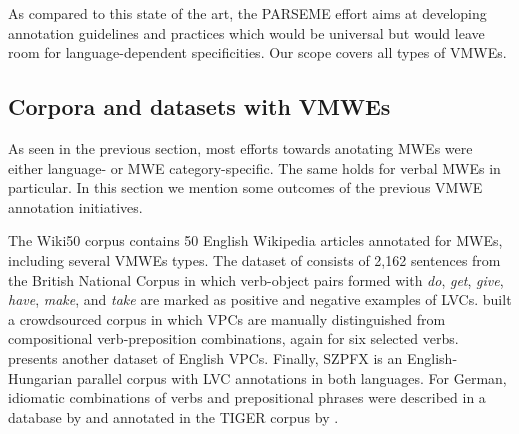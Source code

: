 \documentclass[output=paper,modfonts]{langscibook}
\begin{document}
As compared to this state of the art, the PARSEME effort aims at developing annotation guidelines and practices which would be universal but would leave room for language-dependent specificities. Our scope covers all types of VMWEs.





\subsection{Corpora and datasets with VMWEs}
\label{sec:related-datasets}
\largerpage

As seen in the previous section, most efforts towards anotating MWEs were either language- or MWE category-specific. The same holds for verbal MWEs in particular. In this section we mention some outcomes of the previous VMWE annotation initiatives.


The Wiki50 \citep{wiki50} corpus contains 50 English Wi\-ki\-pe\-dia articles annotated for MWEs, including several VMWEs types.  The dataset of \citet{tu-roth:2011:MWE} consists of 2,162 sentences from the British National Corpus in which verb-object pairs formed with \textit{do}, \textit{get}, \textit{give}, \textit{have}, \textit{make}, and \textit{take} are marked as positive and negative examples of LVCs. \citet{Tu:2012} built a crowdsourced corpus in which VPCs are manually distinguished from compositional verb-preposition combinations, again for six selected verbs. \citet{baldwin08} presents another data\-set of English VPCs. Finally, SZPFX \citep{paralellfx} is an English-Hungarian parallel corpus with LVC annotations in both languages. 
For German, idiomatic combinations of verbs and prepositional phrases were described in a database by \citet{krenn} and annotated in the TIGER corpus by \citet{Brants2005}.
\end{document}
